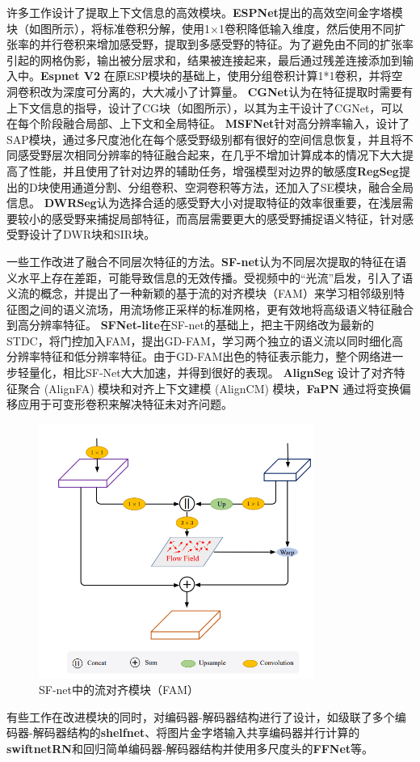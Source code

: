\documentclass[11pt]{article}
\begin{document}
许多工作设计了提取上下文信息的高效模块。\textbf{ESPNet}\cite{ref17}提出的高效空间金字塔模块（如图所示），将标准卷积分解，使用1×1卷积降低输入维度，然后使用不同扩张率的并行卷积来增加感受野，提取到多感受野的特征。为了避免由不同的扩张率引起的网格伪影，输出被分层求和，结果被连接起来，最后通过残差连接添加到输入中。\textbf{Espnet V2}\cite{ref18} 在原ESP模块的基础上，使用分组卷积计算1*1卷积，并将空洞卷积改为深度可分离的，大大减小了计算量。
\textbf{CGNet}\cite{ref19}认为在特征提取时需要有上下文信息的指导，设计了CG块（如图所示），以其为主干设计了CGNet，可以在每个阶段融合局部、上下文和全局特征。
\textbf{MSFNet}\cite{ref20}针对高分辨率输入，设计了SAP模块，通过多尺度池化在每个感受野级别都有很好的空间信息恢复，并且将不同感受野层次相同分辨率的特征融合起来，在几乎不增加计算成本的情况下大大提高了性能，并且使用了针对边界的辅助任务，增强模型对边界的敏感度\textbf{RegSeg}\cite{ref21}提出的D块使用通道分割、分组卷积、空洞卷积等方法，还加入了SE模块，融合全局信息。
\textbf{DWRSeg}\cite{ref22}认为选择合适的感受野大小对提取特征的效率很重要，在浅层需要较小的感受野来捕捉局部特征，而高层需要更大的感受野捕捉语义特征，针对感受野设计了DWR块和SIR块。

一些工作改进了融合不同层次特征的方法。\textbf{SF-net}\cite{ref34}认为不同层次提取的特征在语义水平上存在差距，可能导致信息的无效传播。受视频中的“光流”启发，引入了语义流的概念，并提出了一种新颖的基于流的对齐模块（FAM）来学习相邻级别特征图之间的语义流场，用流场修正采样的标准网格，更有效地将高级语义特征融合到高分辨率特征。
\textbf{SFNet-lite}\cite{ref35}在SF-net的基础上，把主干网络改为最新的STDC，将门控加入FAM，提出GD-FAM，学习两个独立的语义流以同时细化高分辨率特征和低分辨率特征。由于GD-FAM出色的特征表示能力，整个网络进一步轻量化，相比SF-Net大大加速，并得到很好的表现。
\textbf{AlignSeg}\cite{ref36} 设计了对齐特征聚合 (AlignFA) 模块和对齐上下文建模 (AlignCM) 模块，\textbf{FaPN}\cite{ref37} 通过将变换偏移应用于可变形卷积来解决特征未对齐问题。
\begin{figure}[H]
    \centering
    \includegraphics[width=9cm]{sf.png}
    \caption{SF-net\cite{ref34}中的流对齐模块（FAM）}
\centering
\end{figure}
有些工作在改进模块的同时，对编码器-解码器结构进行了设计，如级联了多个编码器-解码器结构的\textbf{shelfnet}\cite{ref23}、将图片金字塔输入共享编码器并行计算的\textbf{swiftnetRN}\cite{ref24}和回归简单编码器-解码器结构并使用多尺度头的\textbf{FFNet}\cite{ref25}等。
\end{document}
